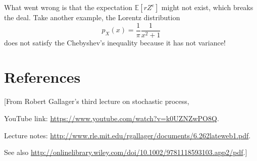 \documentclass{article}
\begin{document}
What went wrong is that the expectation $\mathbb{E}[rZ^e]$
might not exist, which breaks the deal.
%
Take another example, the Lorentz distribution
$$
p_X(x) = \frac{1}{\pi} \frac{1}{x^2 + 1}
$$
does not satisfy the Chebyshev's inequality because
it has not variance!

\section{References}

[From Robert Gallager's third lecture on stochastic process,

YouTube link: \url{https://www.youtube.com/watch?v=k0UZNZwPO8Q}.

Lecture notes: \url{http://www.rle.mit.edu/rgallager/documents/6.262lateweb1.pdf}.

See also \url{http://onlinelibrary.wiley.com/doi/10.1002/9781118593103.app2/pdf}.]
\end{document}
